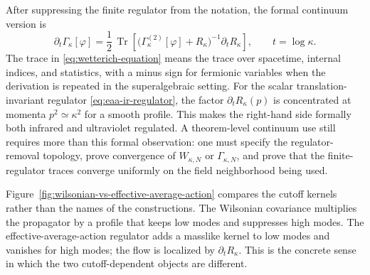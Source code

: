 After suppressing the finite regulator from the notation, the formal
continuum version is
\begin{equation}
  \partial_t\Gamma_{\kappa}[\varphi]
  =
  \frac12\,\operatorname{Tr}
  \left[
    \bigl(\Gamma_{\kappa}^{(2)}[\varphi]+R_{\kappa}\bigr)^{-1}
    \partial_t R_{\kappa}
  \right],
  \qquad t=\log\kappa .
  \label{eq:wetterich-equation}
\end{equation}
The trace in \eqref{eq:wetterich-equation} means the trace over spacetime,
internal indices, and statistics, with a minus sign for fermionic variables
when the derivation is repeated in the superalgebraic setting.  For the scalar
translation-invariant regulator \eqref{eq:eaa-ir-regulator}, the factor
\(\partial_t R_\kappa(p)\) is concentrated at momenta \(p^2\simeq\kappa^2\)
for a smooth profile.  This makes the right-hand side formally both infrared
and ultraviolet regulated.  A theorem-level continuum use still requires
more than this formal observation: one must specify the regulator-removal
topology, prove convergence of \(W_{\kappa,N}\) or \(\Gamma_{\kappa,N}\), and
prove that the finite-regulator traces converge uniformly on the field
neighborhood being used.

Figure~\ref{fig:wilsonian-vs-effective-average-action} compares the cutoff
kernels rather than the names of the constructions.  The Wilsonian covariance
multiplies the propagator by a profile that keeps low modes and suppresses
high modes.  The effective-average-action regulator adds a masslike kernel to
low modes and vanishes for high modes; the flow is localized by
\(\partial_tR_\kappa\).  This is the concrete sense in which the two
cutoff-dependent objects are different.

